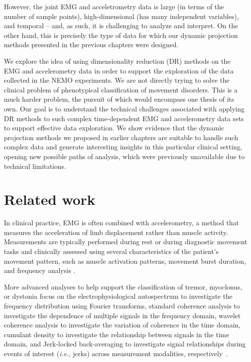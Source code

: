 However, the joint EMG and acceletrometry data is large (in terms of the number of sample points), high-dimensional (has many independent variables), and temporal -- and, as such, it is challenging to analyze and interpret. On the other hand, this is precisely the type of data for which our dynamic projection methods presented in the previous chapters were designed.

We explore the idea of using dimensionality reduction (DR) methods on the EMG and accelerometry data in order to support the exploration of the data collected in the NEMO experiments. We are not directly trying to solve the clinical problem of phenotypical classification of movement disorders. This is a much harder problem, the pursuit of which would encompass one thesis of its own. Our goal is to understand the technical challenges associated with applying DR methods to such complex time-dependent EMG and accelerometry data sets to support effective data exploration. We show evidence that the dynamic projection methods we proposed in earlier chapters are suitable to handle such complex data and generate interesting insights in this particular clinical setting, opening new possible paths of analysis, which were previously unavailable due to technical limitations. 


\section{Related work}
\label{sec:nemo_related}
%
In clinical practice, EMG is often combined with accelerometry, a method that measures the acceleration of limb displacement rather than muscle activity. Measurements are typically performed during rest or during diagnostic movement tasks and clinically assessed using several characteristics of the patient’s movement pattern, such as muscle activation patterns, movement burst duration, and frequency analysis \citep{VANDERVEEN2021176}.

More advanced analyses to help support the classification of tremor, myoclonus, or dystonia focus on the electrophysiological autospectrum to investigate the frequency distribution using Fourier transforms, standard coherence analysis to investigate the dependence of multiple signals in the frequency domain, wavelet coherence analysis to investigate the variation of coherence in the time domain, cumulant density to investigate the relationship between signals in the time domain, and Jerk-locked back-averaging to investigate signal relationships during events of interest (\emph{i.e.}, jerks) across measurement modalities, respectively~\citep{nijmeijer2014emg, tijssen2000frequency, grosse2004patterns, kramer2018wavelet, Stouwe2015, grosse2003abnormal}.

